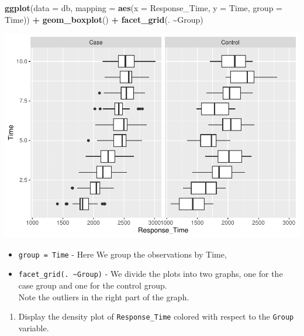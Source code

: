 \documentclass[
]{article}
\newenvironment{Shaded}{\begin{snugshade}}{\end{snugshade}}
\newcommand{\AttributeTok}[1]{\textcolor[rgb]{0.13,0.29,0.53}{#1}}
\newcommand{\FunctionTok}[1]{\textcolor[rgb]{0.13,0.29,0.53}{\textbf{#1}}}
\newcommand{\NormalTok}[1]{#1}
\newcommand{\SpecialCharTok}[1]{\textcolor[rgb]{0.81,0.36,0.00}{\textbf{#1}}}
\providecommand{\tightlist}{%
  \setlength{\itemsep}{0pt}\setlength{\parskip}{0pt}}
\begin{document}
\begin{Shaded}
\begin{Highlighting}[]
\FunctionTok{ggplot}\NormalTok{(}\AttributeTok{data =}\NormalTok{ db, }
       \AttributeTok{mapping =} \FunctionTok{aes}\NormalTok{(}\AttributeTok{x =}\NormalTok{ Response\_Time, }\AttributeTok{y =}\NormalTok{ Time, }\AttributeTok{group =}\NormalTok{ Time)) }\SpecialCharTok{+} 
  \FunctionTok{geom\_boxplot}\NormalTok{() }\SpecialCharTok{+} 
  \FunctionTok{facet\_grid}\NormalTok{(. }\SpecialCharTok{\textasciitilde{}}\NormalTok{Group)}
\end{Highlighting}
\end{Shaded}

\includegraphics{Simulated_example_files/figure-latex/unnamed-chunk-12-1.pdf}

\begin{itemize}
\tightlist
\item
  \texttt{group\ =\ Time} - Here We group the observations by Time,
\item
  \texttt{facet\_grid(.\ \textasciitilde{}Group)} - We divide the plots
  into two graphs, one for the case group and one for the control
  group.\\
  Note the outliers in the right part of the graph.
\end{itemize}

\begin{enumerate}
\def\labelenumi{\alph{enumi}.}
\setcounter{enumi}{11}
\tightlist
\item
  Display the density plot of \texttt{Response\_Time} colored with
  respect to the \texttt{Group} variable.
\end{enumerate}
\end{document}
